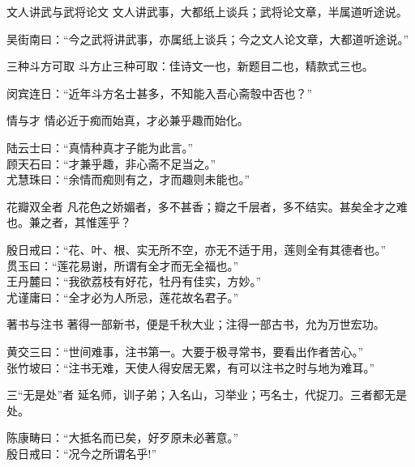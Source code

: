 \begin{yulu}{文人讲武与武将论文}
文人讲武事，大都纸上谈兵；武将论文章，半属道听途说。
\begin{comments}
吴街南曰：“今之武将讲武事，亦属纸上谈兵；今之文人论文章，大都道听途说。”
\end{comments}
\end{yulu}

\begin{yulu}{三种斗方可取}
斗方止三种可取：佳诗文一也，新题目二也，精款式三也。
\begin{comments}
闵宾连日：“近年斗方名士甚多，不知能入吾心斋彀中否也？”
\end{comments}
\end{yulu}

\begin{yulu}{情与才}
情必近于痴而始真，才必兼乎趣而始化。
\begin{comments}
陆云士曰：“真情种真才子能为此言。” \\
顾天石曰：“才兼乎趣，非心斋不足当之。” \\
尤慧珠曰：“余情而痴则有之，才而趣则未能也。”
\end{comments}
\end{yulu}

\begin{yulu}{花瓣双全者}
凡花色之娇媚者，多不甚香；瓣之千层者，多不结实。甚矣全才之难也。兼之者，其惟莲乎？
\begin{comments}
殷日戒曰：“花、叶、根、实无所不空，亦无不适于用，莲则全有其德者也。” \\
贯玉曰：“莲花易谢，所谓有全才而无全福也。” \\
王丹麓曰：“我欲荔枝有好花，牡丹有佳实，方妙。” \\
尤谨庸曰：“全才必为人所忌，莲花故名君子。”
\end{comments}
\end{yulu}

\begin{yulu}{著书与注书}
著得一部新书，便是千秋大业；注得一部古书，允为万世宏功。
\begin{comments}
黄交三曰：“世间难事，注书第一。大要于极寻常书，要看出作者苦心。” \\
张竹坡曰：“注书无难，天使人得安居无累，有可以注书之时与地为难耳。”
\end{comments}
\end{yulu}

\begin{yulu}{三“无是处”者}
延名师，训子弟；入名山，习举业；丐名士，代捉刀。三者都无是处。
\begin{comments}
陈康畴曰：“大抵名而已矣，好歹原未必著意。” \\
殷日戒曰：“况今之所谓名乎!”
\end{comments}
\end{yulu}


